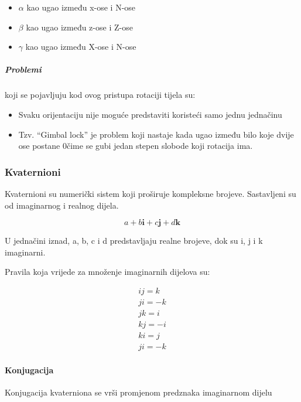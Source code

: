 \documentclass[../Document.tex]{subfiles}
\begin{document}
\begin{itemize}
    \item $\alpha$ kao ugao između x-ose i N-ose
    \item $\beta$ kao ugao između z-ose i Z-ose
    \item $\gamma$ kao ugao između X-ose i N-ose
\end{itemize}


\subparagraph{Problemi} koji se pojavljuju kod ovog pristupa rotaciji tijela su:

\begin{itemize}
    \item Svaku orijentaciju nije moguće predstaviti koristeći samo jednu jednačinu
    \item Tzv. ``Gimbal lock'' je problem koji nastaje kada ugao između bilo koje dvije ose postane 0\textdegree čime se gubi jedan stepen slobode koji rotacija ima.
\end{itemize}

\subsubsection{Kvaternioni}
Kvaternioni su numerički sistem koji proširuje kompleksne brojeve. Sastavljeni su od imaginarnog i realnog dijela.

$$
    a+b\mathbf{i}+c\mathbf{j}+d\mathbf{k}
$$

\noindent U jednačini iznad, a, b, c i d predstavljaju realne brojeve, dok su i, j i k imaginarni.

\noindent Pravila koja vrijede za množenje imaginarnih dijelova su:

\begin{align*}
    ij=k  \\
    ji=-k \\
    jk=i  \\
    kj=-i \\
    ki=j  \\
    ji=-k
\end{align*}


\paragraph{Konjugacija}
Konjugacija kvaterniona se vrši promjenom predznaka imaginarnom dijelu
\end{document}
